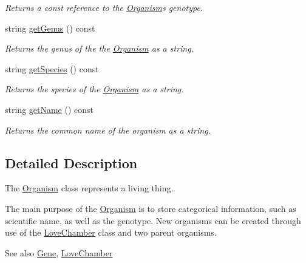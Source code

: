 \begin{DoxyCompactItemize}
\begin{DoxyCompactList}\small\item\em Returns a const reference to the \hyperlink{class_organism}{Organism}\textquotesingle{}s genotype. \end{DoxyCompactList}\item 
string \hyperlink{class_organism_a7e6b427ff537967ae93bf1ee3a4adbfe}{get\+Genus} () const \hypertarget{class_organism_a7e6b427ff537967ae93bf1ee3a4adbfe}{}\label{class_organism_a7e6b427ff537967ae93bf1ee3a4adbfe}

\begin{DoxyCompactList}\small\item\em Returns the genus of the the \hyperlink{class_organism}{Organism} as a string. \end{DoxyCompactList}\item 
string \hyperlink{class_organism_a7d7d392b253bfacf2e13855de9b7312a}{get\+Species} () const \hypertarget{class_organism_a7d7d392b253bfacf2e13855de9b7312a}{}\label{class_organism_a7d7d392b253bfacf2e13855de9b7312a}

\begin{DoxyCompactList}\small\item\em Returns the species of the \hyperlink{class_organism}{Organism} as a string. \end{DoxyCompactList}\item 
string \hyperlink{class_organism_a3b539756747214049f9912a55cb7e483}{get\+Name} () const \hypertarget{class_organism_a3b539756747214049f9912a55cb7e483}{}\label{class_organism_a3b539756747214049f9912a55cb7e483}

\begin{DoxyCompactList}\small\item\em Returns the common name of the organism as a string. \end{DoxyCompactList}\end{DoxyCompactItemize}


\subsection{Detailed Description}
The \hyperlink{class_organism}{Organism} class represents a living thing. 

The main purpose of the \hyperlink{class_organism}{Organism} is to store categorical information, such as scientific name, as well as the genotype. New organisms can be created through use of the \hyperlink{class_love_chamber}{Love\+Chamber} class and two parent organisms. \begin{DoxySeeAlso}{See also}
\hyperlink{class_gene}{Gene}, \hyperlink{class_love_chamber}{Love\+Chamber} 
\end{DoxySeeAlso}



